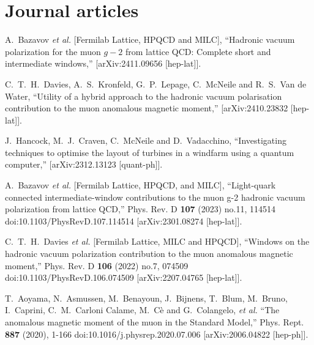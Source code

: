 \section{Journal articles}

\begin{thebibliography}{130}

A.~Bazavov \textit{et al.} [Fermilab Lattice, HPQCD and MILC],
``Hadronic vacuum polarization for the muon $g-2$ from lattice QCD: Complete short and intermediate windows,''
[arXiv:2411.09656 [hep-lat]].
  
C.~T.~H.~Davies, A.~S.~Kronfeld, G.~P.~Lepage, C.~McNeile and R.~S.~Van de Water,
``Utility of a hybrid approach to the hadronic vacuum polarisation contribution to the muon anomalous magnetic moment,''
[arXiv:2410.23832 [hep-lat]].
  

J.~Hancock, M.~J.~Craven, C.~McNeile and D.~Vadacchino,
``Investigating techniques to optimise the layout of turbines in a windfarm using a quantum computer,''
[arXiv:2312.13123 [quant-ph]].
  
A.~Bazavov \textit{et al.} [Fermilab Lattice, HPQCD, and MILC],
``Light-quark connected intermediate-window contributions to the muon g-2 hadronic vacuum polarization from lattice QCD,''
Phys. Rev. D \textbf{107} (2023) no.11, 114514
doi:10.1103/PhysRevD.107.114514
[arXiv:2301.08274 [hep-lat]].
  
C.~T.~H.~Davies \textit{et al.} [Fermilab Lattice, MILC and HPQCD],
``Windows on the hadronic vacuum polarization contribution to the
muon anomalous magnetic moment,''
Phys. Rev. D \textbf{106} (2022) no.7, 074509
doi:10.1103/PhysRevD.106.074509
[arXiv:2207.04765 [hep-lat]].

T.~Aoyama, N.~Asmussen, M.~Benayoun, J.~Bijnens, T.~Blum, M.~Bruno,
I.~Caprini, C.~M.~Carloni Calame, M.~C\`e and G.~Colangelo, \textit{et
  al.}
``The anomalous magnetic moment of the muon in the Standard Model,''
Phys. Rept. \textbf{887} (2020), 1-166
doi:10.1016/j.physrep.2020.07.006
[arXiv:2006.04822 [hep-ph]].


\end{thebibliography}
